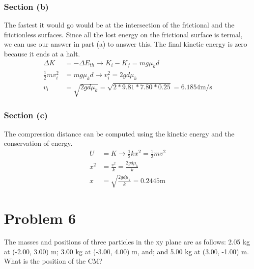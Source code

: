 \documentclass[12pt]{article}
\begin{document}
\subsubsection*{Section (b)}
The fastest it would go would be at the intersection of the frictional and the frictionless surfaces. Since all the lost energy on the frictional surface is termal, we can use our answer in part (a) to answer this. The final kinetic energy is zero because it ends at a halt.
\begin{align*}
    \Delta K    &=  -\Delta E_{th}\rightarrow
    K_i - K_f   =  mg\mu_k d\\
    \frac{1}{2}mv_i^2   &=  mg\mu_k d\rightarrow
    v_i^2   =  2gd \mu_k\\
    v_i &=  \sqrt{2gd \mu_k}
        =   \sqrt{2*9.81*7.80*0.25}
        =   \boxed{6.1854\unit{\meter/\second}}
\end{align*}

\subsubsection*{Section (c)}
The compression distance can be computed using the kinetic energy and the conservation of energy.
\begin{align*}
    U   &=  K\rightarrow
    \frac{1}{2}kx^2 =  \frac{1}{2}mv^2\\
    x^2 &=  \frac{v^2}{k} 
        =   \frac{2gd \mu_k}{k}\\
    x   &=  \sqrt{\frac{2gd \mu_k}{k}}
        =   \boxed{0.2445\unit{\meter}}
\end{align*}

\pagebreak
\section*{Problem 6}
The masses and positions of three particles in the xy plane are as follows: 2.05 kg at (-2.00, 3.00) m; 3.00 kg at (-3.00, 4.00) m, and; and 5.00 kg at (3.00, -1.00) m. What is the position of the CM?
\end{document}
